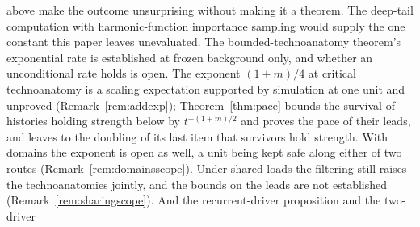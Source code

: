 above make the outcome unsurprising without making it a theorem. The
deep-tail computation with harmonic-function importance sampling
would supply the one constant this paper leaves unevaluated. The
bounded-technoanatomy theorem's exponential rate is established at
frozen background only, and whether an unconditional rate holds is
open. The exponent $(1+m)/4$ at critical technoanatomy is a scaling expectation supported by simulation at one unit and unproved (Remark~\ref{rem:addexp}); Theorem~\ref{thm:pace} bounds the survival of histories holding strength below by $t^{-(1+m)/2}$ and proves the pace of their leads, and leaves to the doubling of its last item that survivors hold strength. With domains the exponent is open as well, a unit being kept safe along either of two routes (Remark~\ref{rem:domainsscope}). Under shared loads the filtering still raises the technoanatomies jointly, and the bounds on the leads are not established (Remark~\ref{rem:sharingscope}). And the recurrent-driver proposition and the two-driver
